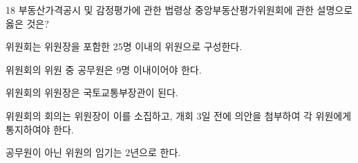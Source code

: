 \begin{question}{18}
부동산가격공시 및 감정평가에 관한 법령상 중앙부동산평가위원회에 관한 설명으로 옳은 것은?
\begin{choices}
  \item 위원회는 위원장을 포함한 25명 이내의 위원으로 구성한다.
  \item 위원회의 위원 중 공무원은 9명 이내이어야 한다.
  \item 위원회의 위원장은 국토교통부장관이 된다.
  \item 위원회의 회의는 위원장이 이를 소집하고, 개회 3일 전에 의안을 첨부하여 각 위원에게 통지하여야 한다.
  \item 공무원이 아닌 위원의 임기는 2년으로 한다.
\end{choices}
\end{question}
